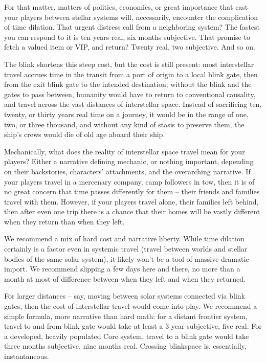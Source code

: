 For that matter, matters of politics, economics, or great importance that cast your players between
stellar systems will, necessarily, encounter the complication of time dilation. That urgent distress
call from a neighboring system? The fastest you can respond to it is ten years real, six months
subjective. That promise to fetch a valued item or VIP, and return? Twenty real, two subjective.
And so on.

The blink shortens this steep cost, but the cost is still present: most interstellar travel accrues time
in the transit from a port of origin to a local blink gate, then from the exit blink gate to the intended
destination; without the blink and the gates to pass between, humanity would have to return to
conventional causality, and travel across the vast distances of interstellar space. Instead of
sacrificing ten, twenty, or thirty years real time on a journey, it would be in the range of one, two,
or three thousand, and without any kind of stasis to preserve them, the ship’s crews would die of
old age aboard their ship.

Mechanically, what does the reality of interstellar space travel mean for your players? Either a
narrative defining mechanic, or nothing important, depending on their backstories, characters’
attachments, and the overarching narrative. If your players travel in a mercenary company, camp
followers in tow, then it is of no great concern that time passes differently for them -- their friends
and families travel with them. However, if your players travel alone, their families left behind, then
after even one trip there is a chance that their homes will be vastly different when they return than
when they left.




We recommend a mix of hard cost and narrative liberty. While time dilation certainly is a factor
even in systemic travel (travel between worlds and stellar bodies of the same solar system), it
likely won’t be a tool of massive dramatic import. We recommend slipping a few days here and
there, no more than a month at most of difference between when they left and when they
returned.

For larger distances -- say, moving between solar systems connected via blink gates, then the
cost of interstellar travel would come into play. We recommend a simple formula, more narrative
than hard math: for a distant frontier system, travel to and from blink gate would take at least a
     3
year  subjective, five real. For a developed, heavily populated Core system, travel to a blink gate
would take three months subjective, nine months real. Crossing blinkspace is, essentially,
instantaneous.

